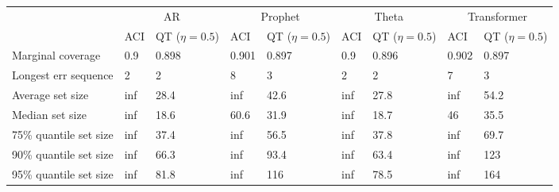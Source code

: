 \begin{tabular}{lllllllll}
\toprule
& \multicolumn{2}{c}{AR}& \multicolumn{2}{c}{Prophet}& \multicolumn{2}{c}{Theta}& \multicolumn{2}{c}{Transformer} \\
& ACI & QT ($\eta=0.5$) & ACI & QT ($\eta=0.5$) & ACI & QT ($\eta=0.5$) & ACI & QT ($\eta=0.5$) \\
\midrule
Marginal coverage & 0.9 & 0.898 & 0.901 & 0.897 & 0.9 & 0.896 & 0.902 & 0.897 \\
Longest err sequence & 2 & 2 & 8 & 3 & 2 & 2 & 7 & 3 \\
Average set size & inf & 28.4 & inf & 42.6 & inf & 27.8 & inf & 54.2 \\
Median set size & inf & 18.6 & 60.6 & 31.9 & inf & 18.7 & 46 & 35.5 \\
75\% quantile set size & inf & 37.4 & inf & 56.5 & inf & 37.8 & inf & 69.7 \\
90\% quantile set size & inf & 66.3 & inf & 93.4 & inf & 63.4 & inf & 123 \\
95\% quantile set size & inf & 81.8 & inf & 116 & inf & 78.5 & inf & 164 \\
\bottomrule
\end{tabular}
